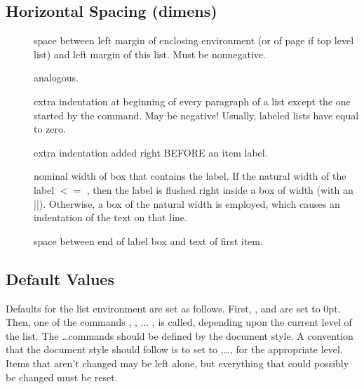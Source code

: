  \subsection{Horizontal Spacing (dimens)}
 \begin{description}
 \item[]   space between left margin of enclosing
   environment (or of page if top level list) and left margin of
                     this list.  Must be nonnegative.
  \item[]  analogous.
  \item[]  extra indentation at beginning of every
     paragraph of a list except the one started by the 
                      command.  May be negative!  Usually, labeled
                       lists have  equal to zero.
   \item[]   extra indentation added right BEFORE an item
                      label.
  \item[]  nominal width of box that contains the label.
                      If the natural width of the
                         label $< =$ ,
                      then the label is flushed right inside a box
                      of width  (with an |\hfil|).
                      Otherwise,
                      a box of the natural width is employed, which
                       causes an indentation of the text on that line.
     \item[]  space between end of label box and text of
                      first item.
  \end{description}


 \subsection{Default Values}
 
 Defaults for the list environment are set as follows.
 First, ,  and 
 are set
      to 0pt.  Then, one of the commands
      , , ... , 
      is called, depending upon the current level of the list.
      The  \ldots commands should be defined by the document
      style.  A convention that the document style should follow is
      to set  to
      ,\ldots,  for
      the appropriate level.  Items that aren't changed may be left
      alone, but everything that could possibly be changed must be
      reset.


